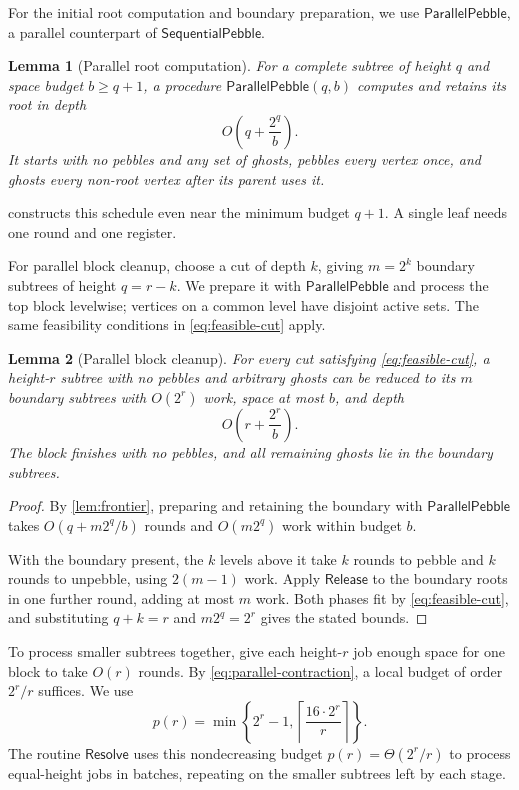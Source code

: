 \documentclass[11pt]{article}
\newtheorem{lemma}[lemma]{Lemma}
\theoremstyle{definition}
\theoremstyle{remark}
\newcommand{\Fast}{\mathsf{SequentialPebble}}
\newcommand{\Release}{\mathsf{Release}}
\newcommand{\Sweep}{\mathsf{ParallelPebble}}
\newcommand{\Resolve}{\mathsf{Resolve}}
\begin{document}
For the initial root computation and boundary preparation, we use $\Sweep$, a parallel counterpart of $\Fast$.

\begin{lemma}[Parallel root computation]
\label{lem:sweep}
For a complete subtree of height $q$ and space budget $b\ge q+1$, a procedure $\Sweep(q,b)$ computes and retains its root in depth
\begin{equation}
O\!\left(q+\frac{2^q}{b}\right).
\label{eq:sweep}
\end{equation}
It starts with no pebbles and any set of ghosts, pebbles every vertex once, and ghosts every non-root vertex after its parent uses it.
\end{lemma}

 constructs this schedule even near the minimum budget $q+1$. A single leaf needs one round and one register.

For parallel block cleanup, choose a cut of depth $k$, giving $m=2^k$ boundary subtrees of height $q=r-k$. We prepare it with $\Sweep$ and process the top block levelwise; vertices on a common level have disjoint active sets. The same feasibility conditions in \cref{eq:feasible-cut} apply.

\begin{lemma}[Parallel block cleanup]
\label{cor:parallel-contraction}
For every cut satisfying \cref{eq:feasible-cut}, a height-$r$ subtree with no pebbles and arbitrary ghosts can be reduced to its $m$ boundary subtrees with $O(2^r)$ work, space at most $b$, and depth
\begin{equation}
O\!\left(r+\frac{2^r}{b}\right).
\label{eq:parallel-contraction}
\end{equation}
The block finishes with no pebbles, and all remaining ghosts lie in the boundary subtrees.
\end{lemma}
\begin{proof}
By \cref{lem:frontier}, preparing and retaining the boundary with $\Sweep$ takes $O(q+m2^q/b)$ rounds and $O(m2^q)$ work within budget $b$.

With the boundary present, the $k$ levels above it take $k$ rounds to pebble and $k$ rounds to unpebble, using $2(m-1)$ work. Apply $\Release$ to the boundary roots in one further round, adding at most $m$ work. Both phases fit by \cref{eq:feasible-cut}, and substituting $q+k=r$ and $m2^q=2^r$ gives the stated bounds.
\end{proof}

To process smaller subtrees together, give each height-$r$ job enough space for one block to take $O(r)$ rounds. By \cref{eq:parallel-contraction}, a local budget of order $2^r/r$ suffices. We use
\begin{equation}
p(r)=\min\left\{2^r-1,\left\lceil\frac{16\cdot2^r}{r}\right\rceil\right\}.
\label{eq:resolver-space}
\end{equation}
The routine $\Resolve$ uses this nondecreasing budget $p(r)=\Theta(2^r/r)$ to process equal-height jobs in batches, repeating on the smaller subtrees left by each stage.
\end{document}
